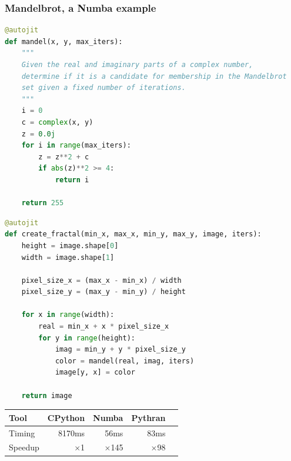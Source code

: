\documentclass[aspectratio=1610]{beamer}
\begin{document}
\begin{frame}[fragile]
    \frametitle{Mandelbrot, a Numba example}
    \begin{minipage}{0.49\textwidth}
\begin{lstlisting}[language=Python,frame=none,backgroundcolor=\color{white},basicstyle=\ttfamily\tiny]
@autojit
def mandel(x, y, max_iters):
    """
    Given the real and imaginary parts of a complex number,
    determine if it is a candidate for membership in the Mandelbrot
    set given a fixed number of iterations.
    """
    i = 0
    c = complex(x, y)
    z = 0.0j
    for i in range(max_iters):
        z = z**2 + c
        if abs(z)**2 >= 4:
            return i

    return 255
    \end{lstlisting}
\end{minipage}
\begin{minipage}{0.49\textwidth} \begin{lstlisting}[language=Python,frame=none,backgroundcolor=\color{white},basicstyle=\ttfamily\tiny]
@autojit
def create_fractal(min_x, max_x, min_y, max_y, image, iters):
    height = image.shape[0]
    width = image.shape[1]

    pixel_size_x = (max_x - min_x) / width
    pixel_size_y = (max_y - min_y) / height
    
    for x in range(width):
        real = min_x + x * pixel_size_x
        for y in range(height):
            imag = min_y + y * pixel_size_y
            color = mandel(real, imag, iters)
            image[y, x] = color

    return image
\end{lstlisting}
\end{minipage}
    \vfill
    \begin{tabular}{|l|r|r|r|r|}
        \hline
     Tool    &  CPython    &   Numba    &   Pythran  \\
        \hline
     Timing  &  8170ms   &    56ms       &   83ms  \\
        \hline
     Speedup & $\times$1 & $\times$145 & $\times$98 \\
    \hline
\end{tabular}
\end{frame}
\end{document}
